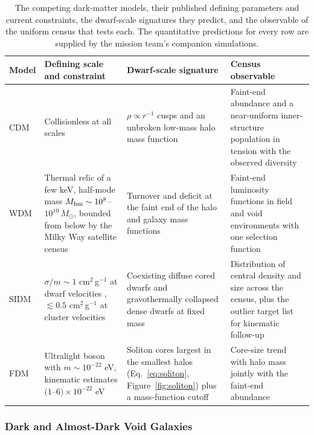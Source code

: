 \documentclass[10pt,onecolumn]{article}
\begin{document}
\begin{table}[tp]
\centering
\sffamily\small
\begin{tabularx}{\textwidth}{@{}p{1.3cm}p{4.6cm}p{4.4cm}X@{}}
\toprule
\textbf{Model} & \textbf{Defining scale and constraint} & \textbf{Dwarf-scale signature} & \textbf{Census observable}\\
\midrule
CDM & Collisionless at all scales \cite{bullock2017} & $\rho\propto r^{-1}$ cusps and an unbroken low-mass halo mass function \cite{deblok2010,moore1999} & Faint-end abundance and a near-uniform inner-structure population in tension with the observed diversity \cite{oman2015}\\
WDM & Thermal relic of a few keV, half-mode mass $M_{\rm hm}\sim10^{8}$--$10^{10}\,M_\odot$, bounded from below by the Milky Way satellite census \cite{nadler2021} & Turnover and deficit at the faint end of the halo and galaxy mass functions & Faint-end luminosity functions in field and void environments with one selection function\\
SIDM & $\sigma/m\sim1$ cm$^2$\,g$^{-1}$ at dwarf velocities \cite{spergel2000,tulinyu2018}, $\lesssim0.5$ cm$^2$\,g$^{-1}$ at cluster velocities \cite{harvey2015} & Coexisting diffuse cored dwarfs and gravothermally collapsed dense dwarfs at fixed mass \cite{kaplinghat2016,ren2019} & Distribution of central density and size across the census, plus the outlier target list for kinematic follow-up\\
FDM & Ultralight boson with $m\sim10^{-22}$ eV, kinematic estimates $(1$--$6)\times10^{-22}$ eV \cite{hu2000,schive2014,calabrese2016} & Soliton cores largest in the smallest halos (Eq.~\eqref{eq:soliton}, Figure~\ref{fig:soliton}) plus a mass-function cutoff & Core-size trend with halo mass jointly with the faint-end abundance\\
\bottomrule
\end{tabularx}
\caption{The competing dark-matter models, their published defining parameters and current constraints, the dwarf-scale signatures they predict, and the observable of the uniform census that tests each. The quantitative predictions for every row are supplied by the mission team's companion simulations.}
\label{tab:dmmodels}
\end{table}

\subsubsection{Dark and Almost-Dark Void Galaxies}
\end{document}
